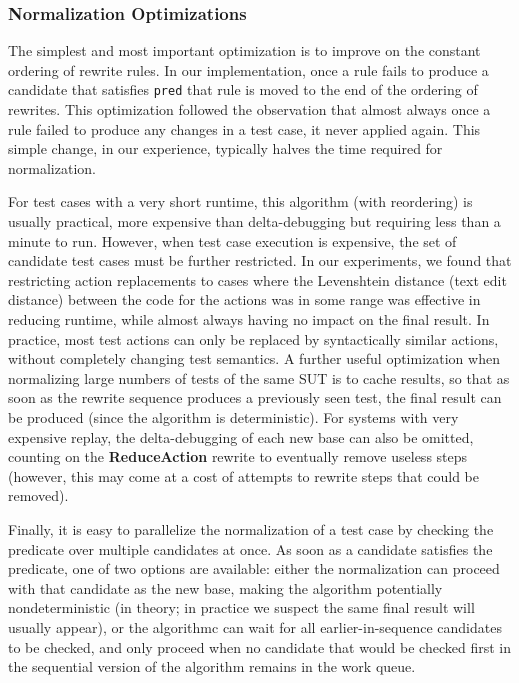 \subsubsection{Normalization Optimizations}

The simplest and most important optimization is to improve on the
constant ordering of rewrite rules.  In our implementation, once a
rule fails to produce a candidate that satisfies {\tt pred} that rule
is moved to the end of the ordering of rewrites.  This optimization
followed the observation that almost always once a rule failed to
produce any changes in a test case, it never applied again.  This
simple change, in our experience, typically halves the time required
for normalization.

For test cases with a very short runtime, this algorithm (with reordering) is usually
practical, more expensive than delta-debugging but requiring less than
a minute to run.  However, when test case execution is expensive, the
set of candidate test cases must be further restricted.  In our
experiments, we found that restricting action replacements to cases
where the Levenshtein \cite{Lev} distance (text edit distance) between
the code for the actions was in some range was effective in reducing
runtime, while almost always having no impact on the final result.  In
practice, most test actions can only be replaced by syntactically
similar actions, without completely changing test semantics.  A
further useful optimization when normalizing large numbers of tests of
the same SUT is to cache results, so that as soon as the rewrite
sequence produces a previously seen test, the final result can be
produced (since the algorithm is deterministic).  For systems with
very expensive replay, the delta-debugging of each new base can also
be omitted, counting on the {\bf ReduceAction} rewrite to eventually
remove useless steps (however, this may come at a cost of attempts to
rewrite steps that could be removed).

Finally, it is easy
to parallelize the normalization of a test case by checking the
predicate over multiple candidates at once.  As soon as a candidate
satisfies the predicate, one of two options are available:  either the
normalization can proceed with that candidate as the new base, making
the algorithm potentially nondeterministic (in theory; in practice we
suspect the same final result will usually appear), or the algorithmc
can wait for all earlier-in-sequence candidates to be checked, and
only proceed when no candidate that would be checked first in the
sequential version of the algorithm remains in the work queue.


